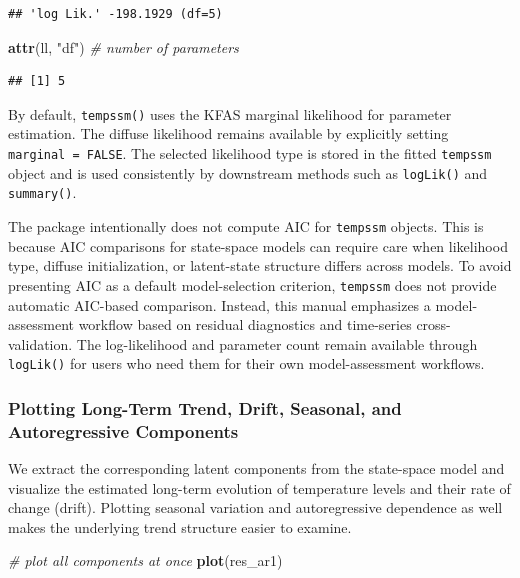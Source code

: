 \documentclass[
]{article}
\newenvironment{Shaded}{\begin{snugshade}}{\end{snugshade}}
\newcommand{\CommentTok}[1]{\textcolor[rgb]{0.56,0.35,0.01}{\textit{#1}}}
\newcommand{\FunctionTok}[1]{\textcolor[rgb]{0.13,0.29,0.53}{\textbf{#1}}}
\newcommand{\NormalTok}[1]{#1}
\newcommand{\StringTok}[1]{\textcolor[rgb]{0.31,0.60,0.02}{#1}}
\begin{document}
\begin{verbatim}
## 'log Lik.' -198.1929 (df=5)
\end{verbatim}

\begin{Shaded}
\begin{Highlighting}[]
\FunctionTok{attr}\NormalTok{(ll, }\StringTok{"df"}\NormalTok{) }\CommentTok{\# number of parameters}
\end{Highlighting}
\end{Shaded}

\begin{verbatim}
## [1] 5
\end{verbatim}

By default, \texttt{tempssm()} uses the KFAS marginal likelihood for
parameter estimation. The diffuse likelihood remains available by
explicitly setting \texttt{marginal\ =\ FALSE}. The selected likelihood
type is stored in the fitted \texttt{tempssm} object and is used
consistently by downstream methods such as \texttt{logLik()} and
\texttt{summary()}.

The package intentionally does not compute AIC for \texttt{tempssm}
objects. This is because AIC comparisons for state-space models can
require care when likelihood type, diffuse initialization, or
latent-state structure differs across models. To avoid presenting AIC as
a default model-selection criterion, \texttt{tempssm} does not provide
automatic AIC-based comparison. Instead, this manual emphasizes a
model-assessment workflow based on residual diagnostics and time-series
cross-validation. The log-likelihood and parameter count remain
available through \texttt{logLik()} for users who need them for their
own model-assessment workflows.

\subsubsection{Plotting Long-Term Trend, Drift, Seasonal, and
Autoregressive
Components}\label{plotting-long-term-trend-drift-seasonal-and-autoregressive-components}

We extract the corresponding latent components from the state-space
model and visualize the estimated long-term evolution of temperature
levels and their rate of change (drift). Plotting seasonal variation and
autoregressive dependence as well makes the underlying trend structure
easier to examine.

\begin{Shaded}
\begin{Highlighting}[]
\CommentTok{\# plot all components at once}
\FunctionTok{plot}\NormalTok{(res\_ar1)}
\end{Highlighting}
\end{Shaded}
\end{document}
